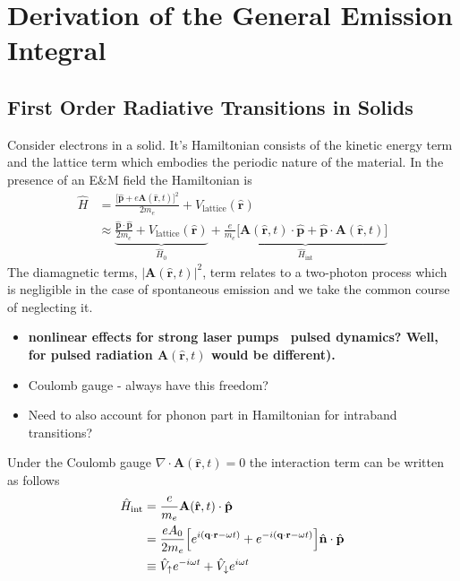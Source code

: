 \newpage
\section{Derivation of the General Emission Integral}
\label{app:derivation_general_emission_integral}

\subsection{First Order Radiative Transitions in Solids}
Consider electrons in a solid. It's Hamiltonian consists of the kinetic energy term and the lattice term which embodies the periodic nature of the material. In the presence of an E\&M field the Hamiltonian is
\begin{align}
\hat{H} &= \frac{\big[\hat{\mathbf{p}}+e\mathbf{A}(\hat{\mathbf{r}},t)\big]^{2}}{2m_{e}} + V_{\text{lattice}}(\hat{\mathbf{r}}) \\
&\approx  \underbrace{ \frac{\hat{\mathbf{p}}\cdot\hat{\mathbf{p}}}{2m_{e}} + V_{\text{lattice}}(\hat{\mathbf{r}}) }_{ \hat{H}_{0} } + \underbrace{ \frac{e}{m_{e}}\Big[\mathbf{A}(\hat{\mathbf{r}},t)\cdot \hat{\mathbf{p}}  +\hat{\mathbf{p}}\cdot\mathbf{A}(\hat{\mathbf{r}},t)\Big] }_{ \hat{H}_{\text{int}} }
\label{eq:first_order_hamiltonian}
\end{align}
The diamagnetic terms, $|\mathbf{A}(\hat{\mathbf{r}},t)|^{2}$, term relates to a two-photon process which is negligible in the case of spontaneous emission and we take the common course of neglecting it.

\begin{itemize}
  \item \textbf{nonlinear effects for strong laser pumps \ pulsed dynamics? Well, for pulsed radiation $\mathbf{A}(\hat{\mathbf{r}},t)$ would be different).}
  \item Coulomb gauge - always have this freedom?
  \item Need to also account for phonon part in Hamiltonian for intraband transitions?
\end{itemize}

Under the Coulomb gauge $\nabla\cdot\mathbf{A}(\hat{\mathbf{r}},t)=0$ the interaction term can be written as follows
\begin{align}
 \hat{H}_{\text{int}} &= \frac{e}{m_{e}}\mathbf{A}(\hat{\mathbf{r}},t)\cdot\hat{\mathbf{p}} \\
&= \frac{eA_{0}}{2m_{e}}\Big[{\large e^{ i(\mathbf{q}\cdot \mathbf{r} -\omega t)}+\large e^{ -i(\mathbf{q}\cdot \mathbf{r} -\omega t)}}  \Big] \hat{\mathbf{n}}\cdot  \hat{\mathbf{p}} \\
&\equiv  \hat{V}_{\uparrow}e^{-i\omega t} + \hat{V}_{\downarrow}e^{i\omega t}
\label{eq:first_order_interaction}
\end{align}

